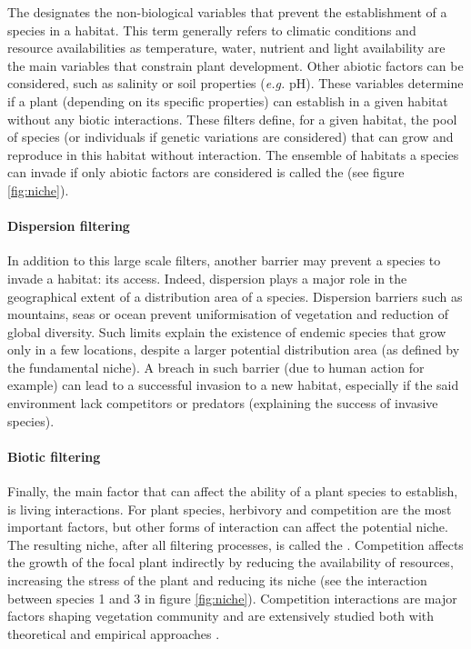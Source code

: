 The  designates the non-biological variables that prevent the establishment of a species in a habitat. This term generally refers to climatic conditions and resource availabilities as temperature, water, nutrient and light availability are the main variables that constrain plant development. Other abiotic factors can be considered, such as salinity \parencite{poorter_leaf_2006} or soil properties (\textit{e.g.} pH). These variables determine if a plant (depending on its specific properties) can establish in a given habitat without any biotic interactions. These filters define, for a given habitat, the pool of species (or individuals if genetic variations are considered) that can grow and reproduce in this habitat without interaction. The ensemble of habitats a species can invade if only abiotic factors are considered is called the  (see figure \ref{fig:niche}). 

\paragraph{Dispersion filtering}

In addition to this large scale filters, another barrier may prevent a species to invade a habitat: its access. Indeed, dispersion plays a major role in the geographical extent of a distribution area of a species. Dispersion barriers such as mountains, seas or ocean prevent uniformisation of vegetation and reduction of global diversity. Such limits explain the existence of endemic species that grow only in a few locations, despite a larger potential distribution area (as defined by the fundamental niche). A breach in such barrier (due to human action for example) can lead to a successful invasion to a new habitat, especially if the said environment lack competitors or predators (explaining the success of invasive species).  




\paragraph{Biotic filtering}

Finally, the main factor that can affect the ability of a plant species to establish, is living interactions. For plant species, herbivory and competition are the most important factors, but other forms of interaction can affect the potential niche. The resulting niche, after all filtering processes, is called the . Competition affects the growth of the focal plant indirectly by reducing the availability of resources, increasing the stress of the plant and reducing its niche (see the interaction between species 1 and 3 in figure \ref{fig:niche}). Competition interactions are major factors shaping vegetation community and are extensively studied both with theoretical \parencite{chesson_general_2000, amarasekare_competitive_2003} and empirical approaches \parencite{kunstler_plant_2016}.


